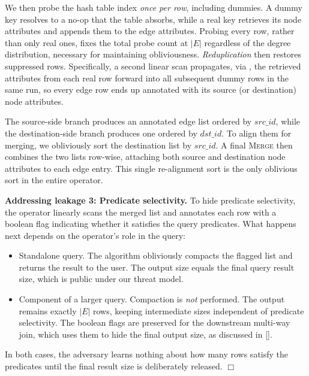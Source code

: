 We then probe the hash table index \emph{once per row}, including dummies.
A dummy key 
resolves to a no-op that the table absorbs, while a real key retrieves its 
node attributes and appends them to the edge attributes. Probing every row, 
rather than only real ones, fixes the 
total probe count at $|E|$ regardless of the degree distribution, necessary
for maintaining obliviousness. 
\emph{Reduplication} then restores suppressed rows. Specifically,
a second linear scan 
propagates, via \cmpset, the retrieved attributes from each real row forward 
into all subsequent dummy rows in the same run, so every edge row ends up 
annotated with its source (or destination) node attributes. 

The source-side branch produces an annotated edge list ordered by $src\_id$, 
while the destination-side branch produces one ordered by $dst\_id$. To 
align them for merging, we obliviously sort the destination list by $src\_id$. 
A final \textsc{Merge} then combines the two lists row-wise, attaching both 
source and destination node attributes to each edge entry. This single 
re-alignment sort is the only oblivious sort in the entire \onehop operator.

\noindent\textbf{Addressing leakage 3: Predicate selectivity.}
To hide predicate selectivity, the operator linearly scans the merged list 
and annotates each row with a boolean flag indicating whether it satisfies 
the query predicates. What happens next depends on the operator's role in 
the query:

\begin{itemize}[leftmargin=*]
    \item {Standalone query.} The algorithm obliviously compacts the 
    flagged list and returns the result to the user. The output size equals 
    the final query result size, which is public under our threat model.

    \item {Component of a larger query.} Compaction is \emph{not} 
    performed. The output remains exactly $|E|$ rows, keeping intermediate sizes 
    independent of predicate 
    selectivity. The boolean flags are preserved for the downstream 
    multi-way join, which uses them to hide the final output size, as 
    discussed in [].
\end{itemize}

In both cases, the adversary learns nothing about how many rows satisfy the 
predicates until the final result size is deliberately released. \hfill$\Box$



